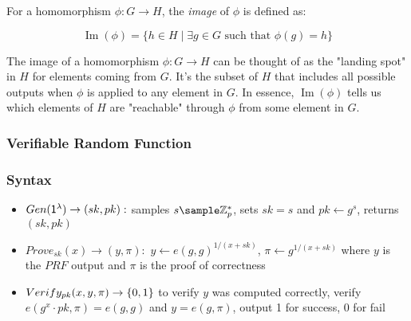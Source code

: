     \begin{definition}
        For a homomorphism $\phi: G \to H$, the \textit{image} of $\phi$ is defined as:
        
        \[\operatorname{Im}(\phi) = \{h \in H \mid \exists g \in G \text{ such that } \phi(g) = h\}\]
        
        \end{definition}

        \begin{remark}
            The image of a homomorphism $\phi: G \to H$ can be thought of as the "landing spot" in $H$ for elements coming from $G$. It's the subset of $H$ that includes all possible outputs when $\phi$ is applied to any element in $G$. In essence, $\operatorname{Im}(\phi)$ tells us which elements of $H$ are "reachable" through $\phi$ from some element in $G$.
        \end{remark}





\newpage
\subsubsection{Verifiable Random Function}

\subsubsection{Syntax}
\begin{itemize}
    \item $Gen(\mathsf{1^{\lambda}}) \to (sk, pk):$ samples $s \sample \Zp^*$, sets $sk = s$ and $pk \gets g^s$, returns $(sk, pk)$
    \item $Prove_{sk}(x) \to (y, \pi):$ $y \gets e(g,g)^{1/(x+sk)}$, $\pi \gets g^{1/(x+sk)}$ where $y$ is the $PRF$ output and $\pi$ is the proof of correctness
    \item $Verify_{pk}(x, y, \pi) \to \{0,1\}$ to verify $y$ was computed correctly, verify $e(g^x \cdot pk, \pi) = e(g,g)$ and $y = e(g, \pi)$, output 1 for success, 0 for fail
\end{itemize}

